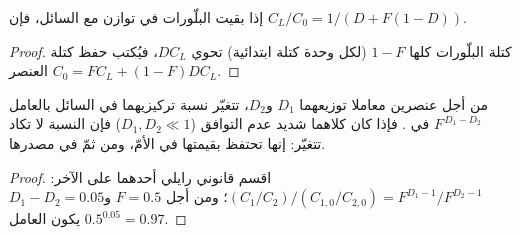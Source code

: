 \begin{proposition}
\label{prop:b2:magmatic-differentiation:equilibrium}
إذا بقيت البلّورات في توازن مع السائل، فإن $C_L/C_0 = 1/(D + F(1-D))$.
\end{proposition}

\begin{proof}
كتلة البلّورات كلها $1-F$ (لكل وحدة كتلة ابتدائية) تحوي $DC_L$، فيُكتب حفظ
كتلة العنصر $C_0 = FC_L + (1-F)DC_L$.
\end{proof}

\begin{corollary}\label{cor:b2:magmatic-differentiation:ratio}
من أجل عنصرين معاملا توزيعهما $D_1$ و$D_2$، تتغيّر نسبة
تركيزيهما في السائل بالعامل $F^{\,D_1-D_2}$ في . فإذا كان كلاهما شديد عدم التوافق ($D_1, D_2 \ll 1$) فإن النسبة
لا تكاد تتغيّر: إنها تحتفظ بقيمتها في  الأمّ، ومن ثمّ في مصدرها.
\end{corollary}

\begin{proof}
اقسم قانوني رايلي أحدهما على الآخر: $(C_1/C_2)/(C_{1,0}/C_{2,0}) = F^{D_1-1}/F^{D_2-1}$؛
ومن أجل $F = 0.5$ و$D_1 - D_2 = 0.05$ يكون العامل $0.5^{0.05} = 0.97$.
\end{proof}

